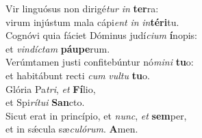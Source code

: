 \evenverse Vir linguósus non dirigé\textit{tur} \textit{in} \textbf{ter}ra:~\*\\
\evenverse virum injústum mala cápi\textit{ent} \textit{in} \textit{in}\textbf{té}\textbf{ri}tu.\\
\oddverse Cognóvi quia fáciet Dóminus judí\textit{ci}\textit{um} \textbf{í}nopis:~\*\\
\oddverse et \textit{vin}\textit{dí}\textit{ctam} \textbf{páu}\textbf{pe}rum.\\
\evenverse Verúmtamen justi confitebúntur nó\textit{mi}\textit{ni} \textbf{tu}o:~\*\\
\evenverse et habitábunt recti \textit{cum} \textit{vul}\textit{tu} \textbf{tu}o.\\
\oddverse Glória Pa\textit{tri}, \textit{et} \textbf{Fí}lio,~\*\\
\oddverse et Spi\textit{rí}\textit{tu}\textit{i} \textbf{San}cto.\\
\evenverse Sicut erat in princípio, et \textit{nunc}, \textit{et} \textbf{sem}per,~\*\\
\evenverse et in sǽcula sæ\textit{cu}\textit{ló}\textit{rum}. \textbf{A}men.\\
